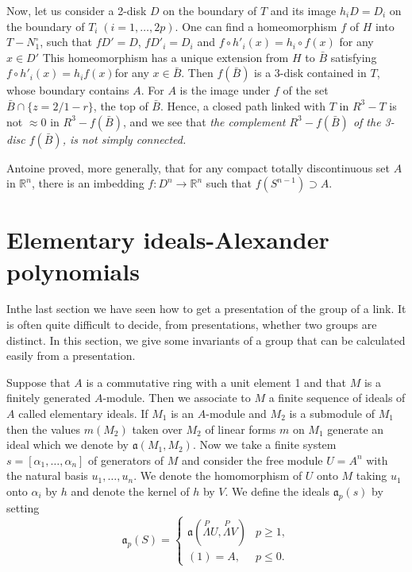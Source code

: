 Now, let us consider a 2-disk $D$ on the boundary of $T$ and its image
$h_i D = D_i$ on the boundary of $T_i \; (i = 1, \ldots, 2p)$. One can
find a homeomorphism $f$ of $H$ into $T - N^\circ_1$, such that $fD' = D$,
$fD'_i = D_i$ and $f \circ h'_i (x) = h_i \circ f(x)$ for any $x \in D'$ This
homeomorphism has a unique extension from $H$ to $\bar{B}$ satisfying
$f \circ h'_i (x) = h_i f(x)$\pageoriginale for any $x \in \bar{B}$. Then
$f(\bar{B})$ is a 3-disk contained in $T$, whose boundary contains
$A$. For $A$ is the image under $f$ of the set $\bar{B} \cap \{ z =
2/1 -r \}$, the top of $\bar{B}$. Hence, a closed path linked with $T$
in $R^3 -T$ is not $\approx 0$ in $R^3 - f(\bar{B})$, and we see
that \textit{the complement $R^3 - f(\bar{B})$ of the 3-disc
  $f(\bar{B})$, is not simply connected.}  

Antoine proved, more generally, that for any compact totally
discontinuous set $A$ in $\mathbb{R}^n$, there is an imbedding $f :
D^n \to \mathbb{R}^n$ such that $f(S^{n-1}) \supset A$. 

\section{Elementary ideals-Alexander polynomials}\label{sec7}%

In\pageoriginale the last section we have seen how to get a
presentation of the group of a link. It is often quite difficult to
decide, from presentations, whether two groups are distinct. In this
section, we give some invariants of a group that can be calculated
easily from a presentation.  

Suppose that $A$ is a commutative ring with a unit element 1 and
that $M$ is a finitely generated $A$-module. Then we associate to $M$
a finite sequence of ideals of $A$ called elementary ideals. If $M_1$
is an $A$-module and $M_2$ is a submodule of $M_1$ then the values $m
(M_2)$ taken over $M_2$ of linear forms $m$ on $M_1$ generate an ideal
which we denote by $\mathfrak{a} (M_1, M_2)$. Now we take a finite system $s
= [ \alpha_1, \ldots, \alpha_n]$ of generators of $M$ and consider the
free module $U = A^n$ with the natural basis $u_1, \ldots, u_n$. We
denote the homomorphism of $U$ onto $M$ taking $u_1$ onto $\alpha_i$
by $h$ and denote the kernel of $h $ by $V$. We define the ideals
$\mathfrak{a}_p(s)$ by setting  
$$
\mathfrak{a}_p (S) =  
\begin{cases}
 \mathfrak{a} (\overset{P}{\Lambda} U, \overset{P}{\Lambda} V) & p \geq 1,\\
(1) = A, & p \leq 0.
\end{cases}
$$


